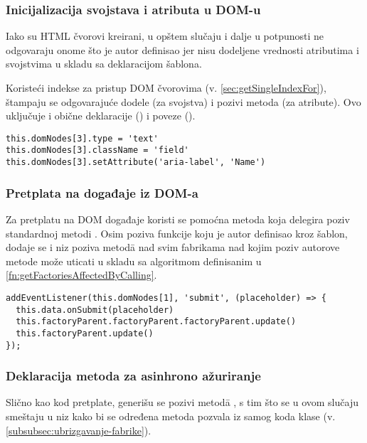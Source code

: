 \subsubsection{Inicijalizacija svojstava i atributa u DOM-u}
\label{subsubsec:init-part-7}

Iako su HTML čvorovi kreirani, u opštem slučaju i dalje u potpunosti ne odgovaraju onome što je autor definisao jer nisu dodeljene vrednosti atributima i svojstvima u skladu sa deklaracijom šablona.

Koristeći indekse za pristup DOM čvorovima (v. \cref{sec:getSingleIndexFor}), štampaju se odgovarajuće dodele (za svojstva) i pozivi metoda (za atribute).
Ovo uključuje i obične deklaracije () i poveze ().

\begin{lstlisting}
this.domNodes[3].type = 'text'
this.domNodes[3].className = 'field'
this.domNodes[3].setAttribute('aria-label', 'Name')
\end{lstlisting}

\subsubsection{Pretplata na događaje iz DOM-a}
\label{subsubsec:pretplata-na-dogadjaje-iz-doma}
\label{subsubsec:init-part-8}

Za pretplatu na DOM događaje koristi se pomoćna metoda koja delegira poziv standardnoj metodi .
Osim poziva funkcije koju je autor definisao kroz šablon, dodaje se i niz poziva metod\=a  nad svim fabrikama nad kojim poziv autorove metode može uticati u skladu sa algoritmom definisanim u \cref{fn:getFactoriesAffectedByCalling}.

\begin{lstlisting}
addEventListener(this.domNodes[1], 'submit', (placeholder) => {
  this.data.onSubmit(placeholder)
  this.factoryParent.factoryParent.factoryParent.update()
  this.factoryParent.update()
});
\end{lstlisting}

\subsubsection{Deklaracija metoda za asinhrono ažuriranje}
\label{subsubsec:init-part-9}

Slično kao kod pretplate, generišu se pozivi metod\=a , s tim što se u ovom slučaju smeštaju u niz kako bi se određena metoda pozvala iz samog koda klase (v. \cref{subsubsec:ubrizgavanje-fabrike}).

